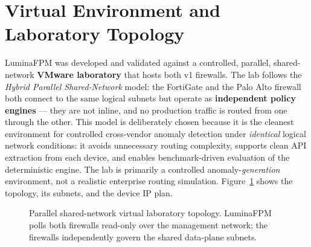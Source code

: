\documentclass[12pt,a4paper]{report}
\renewcommand{\_}{\textunderscore\allowbreak}
\begin{document}
\section{Virtual Environment and Laboratory Topology}
\label{sec:ch3-lab}

LuminaFPM was developed and validated against a controlled, parallel, shared-network \textbf{VMware laboratory} that hosts both v1 firewalls. The lab follows the \emph{Hybrid Parallel Shared-Network} model: the FortiGate and the Palo Alto firewall both connect to the same logical subnets but operate as \textbf{independent policy engines} — they are not inline, and no production traffic is routed from one through the other. This model is deliberately chosen because it is the cleanest environment for controlled cross-vendor anomaly detection under \emph{identical} logical network conditions: it avoids unnecessary routing complexity, supports clean API extraction from each device, and enables benchmark-driven evaluation of the deterministic engine. The lab is primarily a controlled anomaly-\emph{generation} environment, not a realistic enterprise routing simulation. Figure~\ref{fig:labtopo} shows the topology, its subnets, and the device IP plan.

\begin{figure}[htbp]
\centering
{}
\caption{Parallel shared-network virtual laboratory topology. LuminaFPM polls both firewalls read-only over the management network; the firewalls independently govern the shared data-plane subnets.}
\label{fig:labtopo}
\end{figure}
\end{document}
